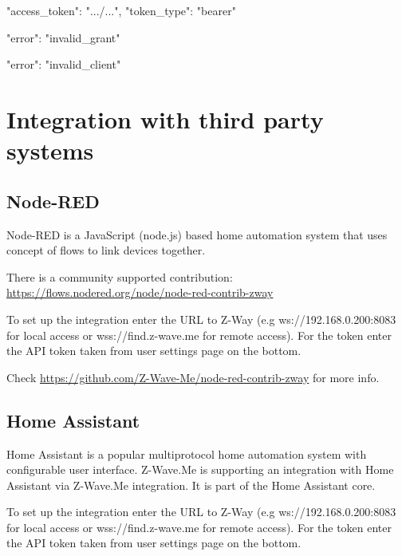 \begin{listingverbatim}
{
    "access_token": ".../...",
    "token_type": "bearer"
}
\end{listingverbatim}

\begin{listingverbatim}
{
    "error": "invalid_grant"
}
\end{listingverbatim}

\begin{listingverbatim}
{
    "error": "invalid_client"
}
\end{listingverbatim}


\section{Integration with third party systems}
\label{integratingzway}

\subsection{Node-RED}
Node-RED is a JavaScript (node.js) based home automation system that uses
concept of flows to link devices together.

There is a community supported contribution:
\url{https://flows.nodered.org/node/node-red-contrib-zway}

To set up the integration enter the URL to Z-Way (e.g ws://192.168.0.200:8083
for local access or wss://find.z-wave.me for remote access). For the token
enter the API token taken from user settings page on the bottom.

Check \url{https://github.com/Z-Wave-Me/node-red-contrib-zway} for more
info.

\subsection{Home Assistant}
Home Assistant is a popular multiprotocol home automation system with
configurable user interface. Z-Wave.Me is supporting an integration with
Home Assistant via Z-Wave.Me integration. It is part of the Home Assistant
core.

To set up the integration enter the URL to Z-Way (e.g ws://192.168.0.200:8083
for local access or wss://find.z-wave.me for remote access). For the token
enter the API token taken from user settings page on the bottom.

